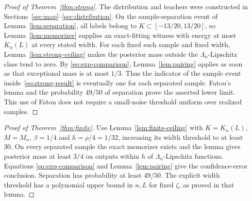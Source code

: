 \documentclass[11pt]{article}
\theoremstyle{remark}\newtheorem{remark}[theorem]{Remark}
\begin{document}
\begin{proof}[Proof of Theorem~\ref{thm:strong}]
The distribution and teachers were constructed in
Sections~\ref{sec:map}--\ref{sec:distribution}.
On the sample-separation event of Lemma~\ref{lem:separation}, all labels
belong to $K\subset[-13/20,13/20]$, so
Lemma~\ref{lem:memorizer} supplies an exact-fitting witness with energy
at most $K_n(L)$ at every stated width. For each fixed such sample and
fixed width, Lemma~\ref{lem:strong-ceiling} makes the posterior mass
outside the $\Lambda_n$-Lipschitz class tend to zero. By
\eqref{eq:exp-comparison}, Lemma~\ref{lem:pairing} applies as soon as
that exceptional mass is at most $1/3$. Thus the indicator of the
sample event inside~\eqref{eq:strong-result} is eventually one for
each separated sample. Fatou's lemma and the probability $49/50$ of
separation prove the asserted lower limit. This use of Fatou does not
require a small-noise threshold uniform over realized samples.
\end{proof}

\begin{proof}[Proof of Theorem~\ref{thm:finite}]
Use Lemma~\ref{lem:finite-ceiling} with $K=K_n(L)$, $M=M_n$,
$\beta=1/4$ and $h=\rho/4=1/32$, increasing its width threshold to
at least $30$. On every separated sample the exact memorizer exists
and the lemma gives posterior mass at least $3/4$ on outputs within
$h$ of $\Lambda_n$-Lipschitz functions. Equations
\eqref{eq:exp-comparison} and Lemma~\ref{lem:pairing} give the
confidence-error conclusion. Separation has probability at least
$49/50$. The explicit width threshold has a polynomial upper bound
in $n,L$ for fixed $\zeta$, as proved in that lemma.
\end{proof}
\end{document}
